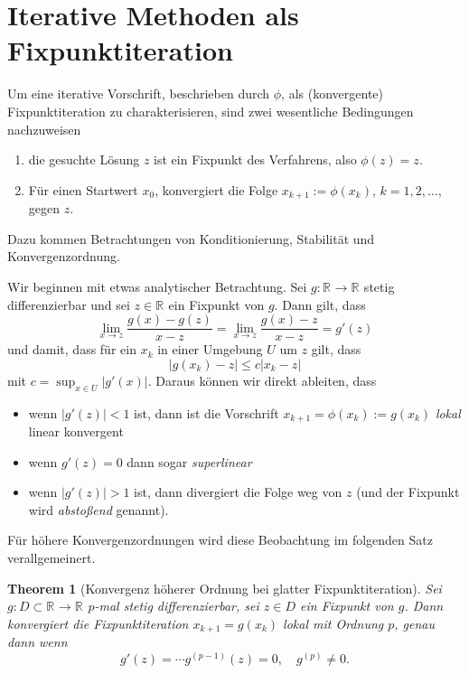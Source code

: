 \documentclass[
]{book}
\providecommand{\tightlist}{%
  \setlength{\itemsep}{0pt}\setlength{\parskip}{0pt}}
\newtheorem{theorem}{Theorem}[chapter]
\theoremstyle{definition}
\theoremstyle{definition}
\theoremstyle{definition}
\theoremstyle{definition}
\theoremstyle{remark}
\begin{document}
\hypertarget{iterative-methoden-als-fixpunktiteration}{%
\section{Iterative Methoden als Fixpunktiteration}\label{iterative-methoden-als-fixpunktiteration}}

Um eine iterative Vorschrift, beschrieben durch \(\phi\), als (konvergente) Fixpunktiteration zu charakterisieren, sind zwei wesentliche Bedingungen nachzuweisen

\begin{enumerate}
\def\labelenumi{\arabic{enumi}.}
\tightlist
\item
  die gesuchte Lösung \(z\) ist ein Fixpunkt des Verfahrens, also \(\phi(z)=z\).
\item
  Für einen Startwert \(x_0\), konvergiert die Folge \(x_{k+1}:=\phi(x_k)\), \(k=1,2,\dotsc\), gegen \(z\).
\end{enumerate}

Dazu kommen Betrachtungen von Konditionierung, Stabilität und Konvergenzordnung.

Wir beginnen mit etwas analytischer Betrachtung. Sei \(g \colon \mathbb R^{}\to \mathbb R^{}\) stetig differenzierbar und sei \(z\in \mathbb R^{}\) ein Fixpunkt von \(g\). Dann gilt, dass
\begin{equation*}
\lim_{x\to z} \frac{g(x)-g(z)}{x-z} = \lim_{x\to z} \frac{g(x)-z}{x-z} = g'(z)
\end{equation*}
und damit, dass für ein \(x_k\) in einer Umgebung \(U\) um \(z\) gilt, dass
\begin{equation*}
|g(x_k)-z|\leq c |x_k-z|
\end{equation*}
mit \(c=\sup_{x\in U}|g'(x)|\).
Daraus können wir direkt ableiten, dass

\begin{itemize}
\tightlist
\item
  wenn \(|g'(z)|<1\) ist, dann ist die Vorschrift \(x_{k+1}=\phi(x_k):=g(x_k)\) \emph{lokal} linear konvergent
\item
  wenn \(g'(z)=0\) dann sogar \emph{superlinear}
\item
  wenn \(|g'(z)|>1\) ist, dann divergiert die Folge weg von \(z\) (und der Fixpunkt wird \emph{abstoßend} genannt).
\end{itemize}

Für höhere Konvergenzordnungen wird diese Beobachtung im folgenden Satz verallgemeinert.

\begin{theorem}[Konvergenz höherer Ordnung bei glatter Fixpunktiteration]
\protect\hypertarget{thm:thm-smooth-fp-conv}{}\label{thm:thm-smooth-fp-conv}Sei \(g\colon D\subset \mathbb R^{}\to \mathbb R^{}\) \(p\)-mal stetig differenzierbar, sei \(z\in D\) ein Fixpunkt von \(g\). Dann konvergiert die Fixpunktiteration \(x_{k+1}=g(x_k)\) \emph{lokal} mit Ordnung \(p\), genau dann wenn
\begin{equation*}
g'(z)=\dotsm g^{(p-1)}(z)=0, \quad g^{(p)}\neq 0.
\end{equation*}
\end{theorem}
\end{document}
